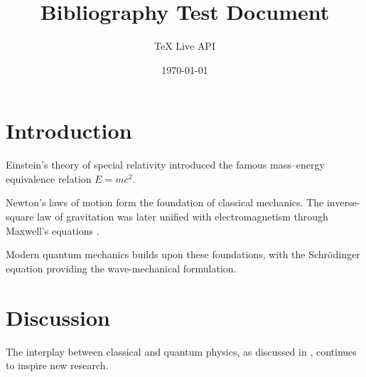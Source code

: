 \documentclass[12pt]{article}
\title{Bibliography Test Document}
\author{TeX Live API}
\date{\today}
\begin{document}
\maketitle

\section{Introduction}

Einstein's theory of special relativity \cite{einstein1905} introduced the famous
mass--energy equivalence relation $E = mc^2$.

Newton's laws of motion \cite{newton1687} form the foundation of classical mechanics.
The inverse-square law of gravitation was later unified with electromagnetism
through Maxwell's equations \cite{maxwell1865}.

Modern quantum mechanics builds upon these foundations, with the Schr\"odinger
equation \cite{schrodinger1926} providing the wave-mechanical formulation.

\section{Discussion}

The interplay between classical and quantum physics, as discussed in
\cite{einstein1905, newton1687}, continues to inspire new research.

\printbibliography[heading=bibintoc, title={References}]
\end{document}
